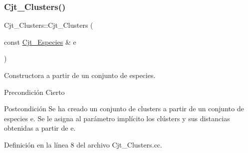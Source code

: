 \subsubsection{\texorpdfstring{Cjt\+\_\+\+Clusters()}{Cjt\_Clusters()}\hspace{0.1cm}{\footnotesize\ttfamily [2/2]}}
{\footnotesize\ttfamily Cjt\+\_\+\+Clusters\+::\+Cjt\+\_\+\+Clusters (\begin{DoxyParamCaption}\item[{const \hyperlink{class_cjt___especies}{Cjt\+\_\+\+Especies} \&}]{e }\end{DoxyParamCaption})}



Constructora a partir de un conjunto de especies. 

\begin{DoxyPrecond}{Precondición}
Cierto 
\end{DoxyPrecond}
\begin{DoxyPostcond}{Postcondición}
Se ha creado un conjunto de clusters a partir de un conjunto de especies e. Se le asigna al parámetro implícito los clústers y sus distancias obtenidas a partir de e. 
\end{DoxyPostcond}


Definición en la línea 8 del archivo Cjt\+\_\+\+Clusters.\+cc.


